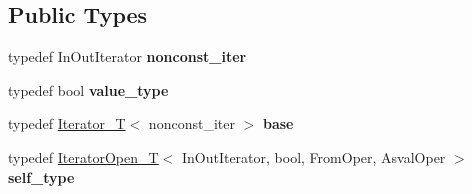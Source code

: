 \subsection*{Public Types}
\begin{DoxyCompactItemize}
\item 
typedef In\+Out\+Iterator {\bfseries nonconst\+\_\+iter}\hypertarget{classswig_1_1IteratorOpen__T_3_01InOutIterator_00_01bool_00_01FromOper_00_01AsvalOper_01_4_a223950cd6c4530b359b6df1986b29602}{}\label{classswig_1_1IteratorOpen__T_3_01InOutIterator_00_01bool_00_01FromOper_00_01AsvalOper_01_4_a223950cd6c4530b359b6df1986b29602}

\item 
typedef bool {\bfseries value\+\_\+type}\hypertarget{classswig_1_1IteratorOpen__T_3_01InOutIterator_00_01bool_00_01FromOper_00_01AsvalOper_01_4_ae65317b8d3188a3bc6afb1184117b743}{}\label{classswig_1_1IteratorOpen__T_3_01InOutIterator_00_01bool_00_01FromOper_00_01AsvalOper_01_4_ae65317b8d3188a3bc6afb1184117b743}

\item 
typedef \hyperlink{classswig_1_1Iterator__T}{Iterator\+\_\+T}$<$ nonconst\+\_\+iter $>$ {\bfseries base}\hypertarget{classswig_1_1IteratorOpen__T_3_01InOutIterator_00_01bool_00_01FromOper_00_01AsvalOper_01_4_adbcb39fdbcfbce47d05d075823013114}{}\label{classswig_1_1IteratorOpen__T_3_01InOutIterator_00_01bool_00_01FromOper_00_01AsvalOper_01_4_adbcb39fdbcfbce47d05d075823013114}

\item 
typedef \hyperlink{classswig_1_1IteratorOpen__T}{Iterator\+Open\+\_\+T}$<$ In\+Out\+Iterator, bool, From\+Oper, Asval\+Oper $>$ {\bfseries self\+\_\+type}\hypertarget{classswig_1_1IteratorOpen__T_3_01InOutIterator_00_01bool_00_01FromOper_00_01AsvalOper_01_4_aaa0804250e2db181d42e3a46d2b8c5f6}{}\label{classswig_1_1IteratorOpen__T_3_01InOutIterator_00_01bool_00_01FromOper_00_01AsvalOper_01_4_aaa0804250e2db181d42e3a46d2b8c5f6}

\end{DoxyCompactItemize}
